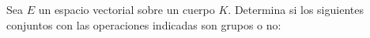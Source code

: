 \question
Sea $E$ un espacio vectorial sobre un cuerpo $K$. Determina si los siguientes conjuntos con las operaciones indicadas son grupos o no:
